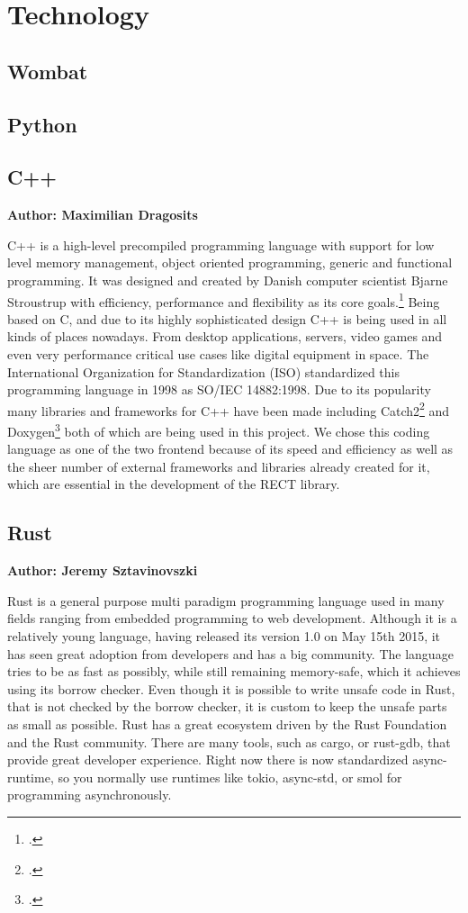 \chapter{Technology}


\section{Wombat}

\section{Python}

\section{C++}
\textbf{Author: Maximilian Dragosits}

C++ is a high-level precompiled programming language with support for low level memory management, object oriented programming, generic and functional programming.
It was designed and created by Danish computer scientist Bjarne Stroustrup with efficiency, performance and flexibility as its core goals.\footcite{lecture_essence_cpp}
Being based on C, and due to its highly sophisticated design C++ is being used in all kinds of places nowadays. From desktop applications, servers, video games and 
even very performance critical use cases like digital equipment in space. The International Organization for Standardization (ISO) standardized this programming
language in 1998 as SO/IEC 14882:1998. Due to its popularity many libraries and frameworks for C++ have been made including Catch2\footcite{catch2_git} and 
Doxygen\footcite{doxygen_main_site} both of which are being used in this project. We chose this coding language as one of the two frontend because of its speed and
efficiency as well as the sheer number of external frameworks and libraries already created for it, which are essential in the development of the RECT library. 

\section{Rust}
\textbf{Author: Jeremy Sztavinovszki}

Rust is a general purpose multi paradigm programming language used in many fields ranging from embedded programming to web development. Although it is a relatively young language, having released its version 1.0 on May 15th 2015, it has seen great adoption from developers and has a big community. The language tries to be as fast as possibly, while still remaining memory-safe, which it achieves using its borrow checker. Even though it is possible to write unsafe code in Rust, that is not checked by the borrow checker, it is custom to keep the unsafe parts as small as possible.
Rust has a great ecosystem driven by the Rust Foundation and the Rust community. There are many tools, such as cargo, or rust-gdb, that provide great developer experience.
Right now there is now standardized async-runtime, so you normally use runtimes like tokio, async-std, or smol for programming asynchronously.

